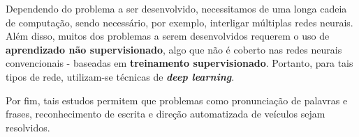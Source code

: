 Dependendo do problema a ser desenvolvido, necessitamos de uma longa cadeia de
computação, sendo necessário, por exemplo, interligar múltiplas redes neurais.
Além disso, muitos dos problemas a serem desenvolvidos requerem o uso de
\textbf{ aprendizado não supervisionado}, algo que não é coberto nas redes
neurais convencionais - baseadas em \textbf{treinamento supervisionado}.
Portanto, para tais tipos de rede, utilizam-se técnicas de \textbf{\textit{deep
learning}}.
\cite{DBLP:journals/corr/Schmidhuber14}

Por fim, tais estudos permitem que problemas como pronunciação de palavras e
frases, reconhecimento de escrita e direção automatizada de veículos
\cite{Russell:1995:AIM:193191} sejam resolvidos.
